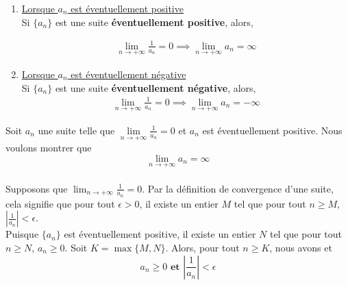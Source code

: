 \documentclass[16pt]{report}
\begin{document}
\begin{multicols*}{2}
    \begin{Lemme}{}{}

        \begin{enumerate}
            \item \underline{Lorsque $a_n$ est éventuellement positive}
                \vspace{1em}\\
                Si $\{ a_n \}$ est une suite 
                \textbf{éventuellement positive}, 
                alors,  

                \begin{align*}
                    \lim\limits_{n\to+\infty}\frac{1}{a_n}  = 0 
                    \implies 
                    \lim\limits_{n\to+\infty}a_n  = \infty
                \end{align*}
            \item \underline{Lorsque $a_n$ est éventuellement négative} 
                \vspace{1em} \\
                Si $\{ a_n \}$ est une suite 
                \textbf{éventuellement négative}, 
                alors,  
                \begin{align*}
                    \lim\limits_{n\to+\infty}\frac{1}{a_n}  = 0 
                    \implies 
                    \lim\limits_{n\to+\infty}a_n  = -\infty
                \end{align*}
        \end{enumerate} 
    \end{Lemme}


    \begin{Preuve}{}{}
    Soit $a_n$ une suite telle que  
    $\lim\limits_{n\to+\infty}\frac{1}{a_n}  = 0$ et $a_n$ est 
    éventuellement positive. Nous voulons montrer que 
    \[ \lim\limits_{n\to+\infty}a_n  = \infty  \]
    \vspace{1em}\\
    Supposons que $\lim_{n \to +\infty} \frac{1}{a_n} = 0$. 
    Par la définition de convergence d'une suite, cela signifie que 
    pour tout $\epsilon > 0$, 
    il existe un entier $M$ tel que pour tout 
    $n \geq M$, $\left|\frac{1}{a_n}\right| < \epsilon$. 
    \vspace{1em}\\
    Puisque $\{ a_n \}$ est éventuellement positive, il existe un 
    entier $N$ tel que pour tout $n \geq N$, $a_n \geq 0$. Soit 
    $K = \max\{M, N\}$. Alors, pour tout $n \geq K$, 
    nous avons et 
    \[ a_n \geq 0 \textbf{ et } \left|\frac{1}{a_n}\right| < \epsilon \] 


\end{Preuve}
\end{multicols*}
\end{document}
